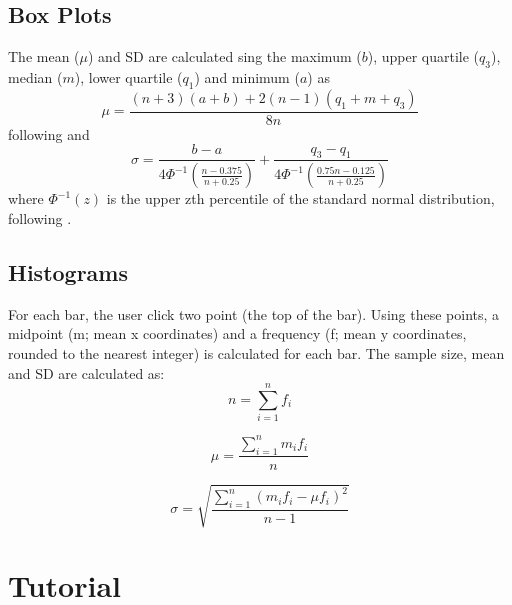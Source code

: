 \documentclass[12pt]{article}
\begin{document}
\subsection{Box Plots} 
The mean ($\mu$) and SD are calculated sing the maximum ($b$), upper quartile ($q_3$), median ($m$), lower quartile ($q_1$) and minimum ($a$) as 
\begin{equation}
\mu = \frac{(n+3)(a+b) + 2(n-1)(q_1 + m + q_3)}{8n}
\end{equation}
following \citet{Bland2015} and
\begin{equation}
\sigma = \frac{b-a}{4\Phi^{-1}(\frac{n-0.375}{n+0.25})} + \frac{q_3-q_1}{4\Phi^{-1}(\frac{0.75n-0.125}{n+0.25})}
\end{equation}
where $\Phi^{-1}(z)$ is the upper zth percentile of the standard normal distribution, following \citet{Wan2014}. 

\subsection{Histograms} 
For each bar, the user click two point (the top of the bar). Using these points, a midpoint (m; mean x coordinates) and a frequency (f; mean y coordinates, rounded to the nearest integer) is calculated for each bar. The sample size, mean and SD are calculated as:
\begin{equation}
n = \sum_{i=1}^n{f_i}
\end{equation}

\begin{equation}
\mu = \frac{\sum_{i=1}^n{m_i f_i}}{n}
\end{equation}

\begin{equation}
\sigma = \sqrt{\frac{\sum_{i=1}^n{(m_i f_i - \mu f_i)^2}}{n-1}}
\end{equation}


\section{Tutorial}



\end{document}
